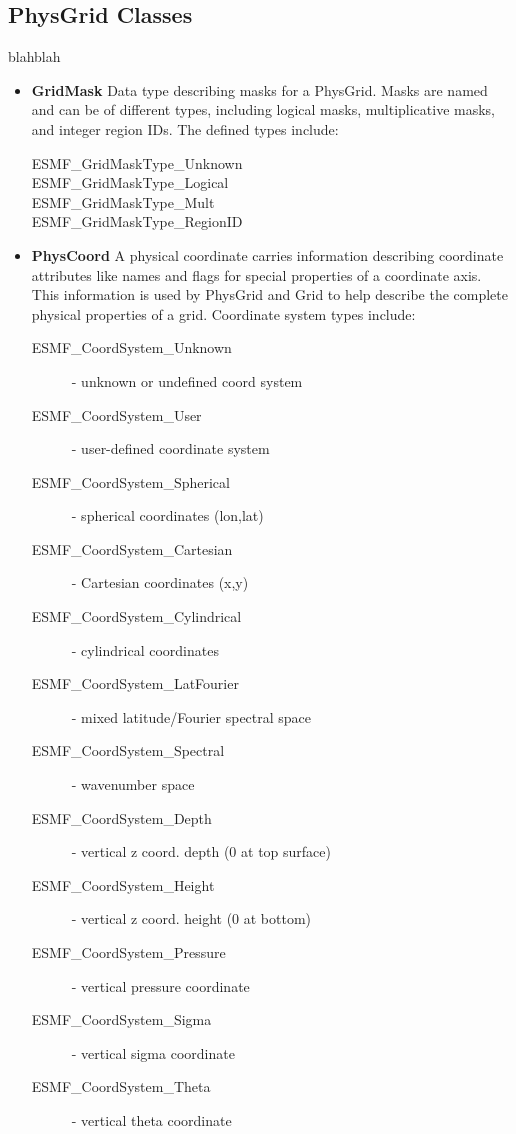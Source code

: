 \subsection{PhysGrid Classes}
blahblah
\begin{itemize}
\item {\bf GridMask} Data type describing masks for a PhysGrid.  Masks
are named and can be of different types, including logical masks,
multiplicative masks, and integer region IDs.  The defined types include:
\begin{description}
\item[ESMF\_GridMaskType\_Unknown]
\item[ESMF\_GridMaskType\_Logical]
\item[ESMF\_GridMaskType\_Mult]
\item[ESMF\_GridMaskType\_RegionID]
\end{description}
\item {\bf PhysCoord} A physical coordinate carries information describing
coordinate attributes like names and flags for special properties of a
coordinate axis.  This information is used by PhysGrid and Grid to help
describe the complete physical properties of a grid.  Coordinate system
types include:
\begin{description}
\item[ESMF\_CoordSystem\_Unknown] - unknown or undefined coord system
\item[ESMF\_CoordSystem\_User] - user-defined coordinate system
\item[ESMF\_CoordSystem\_Spherical] - spherical coordinates (lon,lat)
\item[ESMF\_CoordSystem\_Cartesian] - Cartesian coordinates (x,y)
\item[ESMF\_CoordSystem\_Cylindrical] - cylindrical coordinates
\item[ESMF\_CoordSystem\_LatFourier] - mixed latitude/Fourier spectral space
\item[ESMF\_CoordSystem\_Spectral] - wavenumber space
\item[ESMF\_CoordSystem\_Depth] - vertical z coord. depth (0 at top surface)
\item[ESMF\_CoordSystem\_Height] - vertical z coord. height (0 at bottom)
\item[ESMF\_CoordSystem\_Pressure] - vertical pressure coordinate
\item[ESMF\_CoordSystem\_Sigma] - vertical sigma coordinate
\item[ESMF\_CoordSystem\_Theta] - vertical theta coordinate

\end{description}
\end{itemize}

